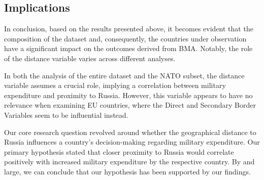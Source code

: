 \documentclass[12pt,a4paper]{article}
\begin{document}
\subsection{Implications}

In conclusion, based on the results presented above, it becomes evident that the composition of the dataset and, consequently, the countries under observation have a significant impact on the outcomes derived from BMA. Notably, the role of the distance variable varies across different analyses. 

In both the analysis of the entire dataset and the NATO subset, the distance variable assumes a crucial role, implying a correlation between military expenditure and proximity to Russia. However, this variable appears to have no relevance when examining EU countries, where the Direct and Secondary Border Variables seem to be influential instead.

Our core research question revolved around whether the geographical distance to Russia influences a country's decision-making regarding military expenditure. Our primary hypothesis stated that closer proximity to Russia would correlate positively with increased military expenditure by the respective country. By and large, we can conclude that our hypothesis has been supported by our findings. \\
\end{document}
